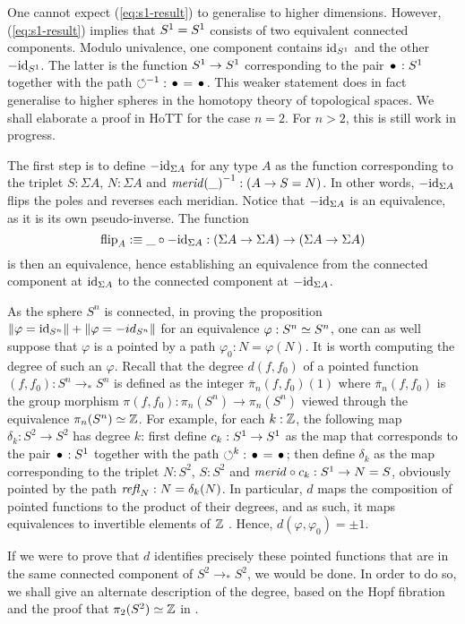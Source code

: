 \documentclass[english,a4]{article}
\newcommand{\Sp}{{S^2}}%
\newcommand{\Sn}{{S^n}}%
\newcommand{\mrd}{\mathit{merid}}%
\newcommand{\susp}[1]{\Sigma{#1}}%
\newcommand{\ptdto}{\to_\ast}%
\newcommand{\flip}{\operatorname{flip}}%
\def\blank{\_}%
\begin{document}
One cannot expect (\ref{eq:s1-result}) to generalise to higher
dimensions. However, (\ref{eq:s1-result}) implies that ${S^1} = {S^1}$
consists of two equivalent connected components. Modulo univalence,
one component contains $\mathord{\mathrm{id}}_{S^1}$ and the other $-\mathord{\mathrm{id}}_{S^1}$. The latter
is the function ${S^1} \to {S^1}$ corresponding to the pair $\base:\Sc$
together with the path $\inv\Sloop:\base=\base$. This weaker statement
does in fact generalise to higher spheres in the homotopy theory of
topological spaces. We shall elaborate a proof in HoTT for the case
$n=2$. For $n>2$, this is still work in progress.

The first step is to define $-\id_{\susp A}$ for any type $A$ as the
function corresponding to the triplet $S:\susp A$, $N:\susp A$ and
$\inv{\mrd(\blank)} : (A \to S=N)$. In other words, $-\id_{\susp A}$
flips the poles and reverses each meridian. Notice that
$-\id_{\susp A}$ is an equivalence, as it is its own
pseudo-inverse. The function
\begin{displaymath}
  \flip_A \defequi \blank \circ -\id_{\susp A} : (\susp A \to \susp A) \to (\susp A \to \susp A)
\end{displaymath}
is then an equivalence, hence establishing an equivalence from the
connected component at $\id_{\susp A}$ to the connected component at
$-\id_{\susp A}$.

As the sphere $S^n$ is connected, in proving the proposition
$\Trunc{\varphi=\id_\Sn}+\Trunc{\varphi=-id_\Sn}$ for an equivalence
$\varphi:\Sn \weq \Sn$, one can as well suppose that $\varphi$ is a
pointed by a path $\varphi_0:N=\varphi(N)$. It is worth computing the
degree of such an $\varphi$. Recall that the degree $d(f,f_0)$ of a
pointed function $(f,f_0):\Sn \ptdto\Sn$ is defined as the integer
$\bar \pi_n(f,f_0)(1)$ where $\bar\pi_n(f,f_0)$ is the group morphism
$\pi(f,f_0) : \pi_n(\Sn) \to \pi_n(\Sn)$ viewed through the
equivalence $\pi_n(\Sn) \weq \ZZ$. For example, for each $k:\mathbb{Z}$, the
following map $\delta_k : \Sp \to \Sp$ has degree $k$: first define
$c_k:{S^1}\to{S^1}$ as the map that corresponds to the pair $\base:\Sc$
together with the path $\Sloop^k:\base=\base$; then define $\delta_k$
as the map corresponding to the triplet $N:\Sp$, $S:\Sp$ and
$\mrd\circ c_k: \Sc \to N=S$, obviously pointed by the path
$\mathop{{\mathit{refl}}_{N}}:N=\delta_k(N)$. In particular, $d$ maps the composition of
pointed functions to the product of their degrees, and as such, it
maps equivalences to invertible elements of $\mathbb{Z}$ . Hence,
$d(\varphi,\varphi_0) = \pm 1$.

If we were to prove that $d$ identifies precisely these pointed
functions that are in the same connected component of
$\Sp \ptdto \Sp$, we would be done. In order to do so, we shall give
an alternate description of the degree, based on the Hopf fibration
and the proof that $\pi_2(\Sp) \weq \ZZ$ in \cite[Ch.~8.?]{HoTT}.
\end{document}
